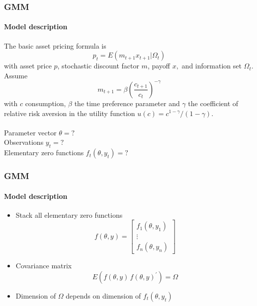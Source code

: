 \documentclass{beamer}
\begin{document}
\begin{frame}\frametitle{GMM}\framesubtitle{Model description}\small
\begin{example}
    The basic asset pricing formula is
    \begin{equation*}
    p_{t}=E\left( m_{t+1}x_{t+1}|\Omega _{t}\right)
    \end{equation*}
    with asset price $p$, stochastic discount factor $m$, payoff $x,$ and information set $\Omega _{t}$. Assume
    \begin{equation*}
    m_{t+1} = \beta \left(\frac{c_{t+1}}{c_t}\right)^{-\gamma}
    \end{equation*}
    with $c$ consumption, $\beta$ the time preference parameter and $\gamma$ the coefficient of relative risk aversion in the utility function $u(c)=c^{1-\gamma}/(1-\gamma)$.\\~\\
    Parameter vector $\theta =?$\\
    Observations $y_{t}=?$\\
    Elementary zero functions $f_{t}(\theta ,y_{t})=?$
\end{example}
\end{frame}


\begin{frame}\frametitle{GMM}\framesubtitle{Model description}
\begin{itemize}
    \item Stack all elementary zero functions
    \begin{equation*}
    f\left( \theta ,y\right) =\left[
    \begin{array}{c}
    f_{1}\left( \theta ,y_{1}\right) \\
    \vdots \\
    f_{n}\left( \theta ,y_{n}\right)%
    \end{array}
    \right]
    \end{equation*}
    \item Covariance matrix
    \begin{equation*}
    E\left( f\left( \theta ,y\right) \,f\left( \theta ,y\right) ^{\prime}\right) =\Omega
    \end{equation*}
    \item Dimension of $\Omega $ depends on dimension of $f_{t}(\theta ,y_{t})$
    \end{itemize}
\end{frame}
\end{document}
